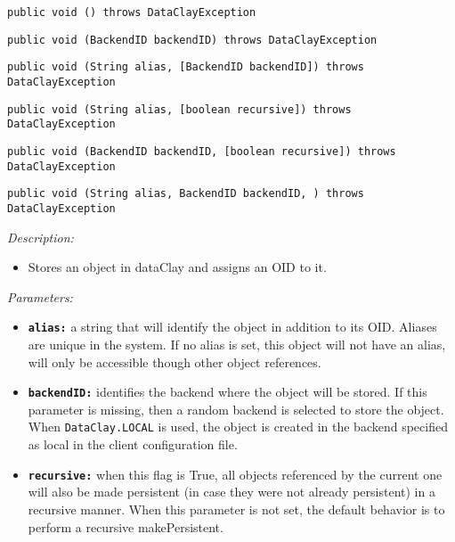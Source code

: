 \begin{dBox}
\label{sec:JavaObjecMakePersistent}
\texttt{public void  () throws DataClayException}

\texttt{public void  (BackendID backendID) \newline throws DataClayException}

\texttt{public void  (String alias, [BackendID backendID]) \newline throws DataClayException}

\texttt{public void  (String alias, [boolean recursive]) \newline throws DataClayException}

\texttt{public void  (BackendID backendID, [boolean recursive]) \newline  throws DataClayException}

\texttt{public void  (String alias, BackendID backendID, 
) throws DataClayException}
\LINE

{\it Description:}

\begin{itemize}
    \item Stores an object in dataClay and assigns an OID to it.
\end{itemize}

{\it Parameters:}

\begin{itemize}
    \item \texttt{\bfseries alias:} a string that will identify the object in addition to its OID. Aliases are unique in the system. If no alias is set, this object will not have an alias, will only be accessible though other object references.
    \item \texttt{\bfseries backendID:} identifies the backend where the object will be stored. If this parameter is missing, then a random backend is selected to store the object. When \texttt{DataClay.LOCAL} is used, the object is created in the backend specified as local in the client configuration file.
    \item \texttt{\bfseries recursive:} when this flag is True, all objects referenced by the current one will also be made persistent (in case they were not already persistent) in a recursive manner. When this parameter is not set, the default behavior is to perform a recursive makePersistent.
\end{itemize}


\end{dBox}

